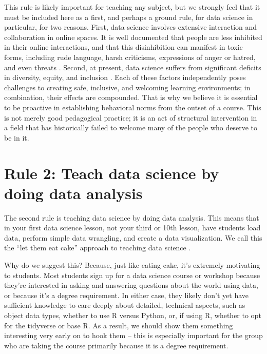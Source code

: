 \documentclass[
  10pt,
  letterpaper,
]{article}
\begin{document}
This rule is likely important for teaching any subject, but we strongly
feel that it must be included here as a first, and perhaps a ground
rule, for data science in particular, for two reasons. First, data
science involves extensive interaction and collaboration in online
spaces. It is well documented that people are less inhibited in their
online interactions, and that this disinhibition can manifest in toxic
forms, including rude language, harsh criticisms, expressions of anger
or hatred, and even threats \citep{suler2004}. Second, at present, data
science suffers from significant deficits in diversity, equity, and
inclusion \citep{young2023mind}. Each of these factors independently
poses challenges to creating safe, inclusive, and welcoming learning
environments; in combination, their effects are compounded. That is why
we believe it is essential to be proactive in establishing behavioral
norms from the outset of a course. This is not merely good pedagogical
practice; it is an act of structural intervention in a field that has
historically failed to welcome many of the people who deserve to be in
it.

\section{Rule 2: Teach data science by doing data
analysis}\label{sec-rule2}

The second rule is teaching data science by doing data analysis. This
means that in your first data science lesson, not your third or 10th
lesson, have students load data, perform simple data wrangling, and
create a data visualization. We call this the ``let them eat cake''
approach to teaching data science \citep{ccetinkaya2021fresh}.

Why do we suggest this? Because, just like eating cake, it's extremely
motivating to students. Most students sign up for a data science course
or workshop because they're interested in asking and answering questions
about the world using data, or because it's a degree requirement. In
either case, they likely don't yet have sufficient knowledge to care
deeply about detailed, technical aspects, such as object data types,
whether to use R versus Python, or, if using R, whether to opt for the
tidyverse or base R. As a result, we should show them something
interesting very early on to hook them -- this is especially important
for the group who are taking the course primarily because it is a degree
requirement.
\end{document}

